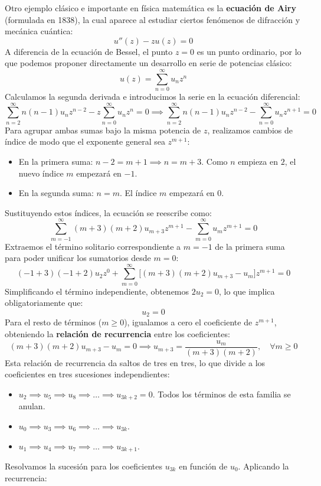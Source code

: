 Otro ejemplo clásico e importante en física matemática es la \textbf{ecuación de Airy} (formulada en 1838), la cual aparece al estudiar ciertos fenómenos de difracción y mecánica cuántica:
\[
    u''(z) - z u(z) = 0
\]
A diferencia de la ecuación de Bessel, el punto $z=0$ es un punto ordinario, por lo que podemos proponer directamente un desarrollo en serie de potencias clásico:
\[
    u(z) = \sum_{n=0}^{\infty} u_n z^n
\]
Calculamos la segunda derivada e introducimos la serie en la ecuación diferencial:
\[
    \sum_{n=2}^{\infty} n(n-1)u_n z^{n-2} - z \sum_{n=0}^{\infty} u_n z^n = 0 \implies \sum_{n=2}^{\infty} n(n-1)u_n z^{n-2} - \sum_{n=0}^{\infty} u_n z^{n+1} = 0
\]
Para agrupar ambas sumas bajo la misma potencia de $z$, realizamos cambios de índice de modo que el exponente general sea $z^{m+1}$:
\begin{itemize}
    \item En la primera suma: $n-2 = m+1 \implies n = m+3$. Como $n$ empieza en $2$, el nuevo índice $m$ empezará en $-1$.
    \item En la segunda suma: $n = m$. El índice $m$ empezará en $0$.
\end{itemize}
Sustituyendo estos índices, la ecuación se reescribe como:
\[
    \sum_{m=-1}^{\infty} (m+3)(m+2)u_{m+3} z^{m+1} - \sum_{m=0}^{\infty} u_m z^{m+1} = 0
\]
Extraemos el término solitario correspondiente a $m=-1$ de la primera suma para poder unificar los sumatorios desde $m=0$:
\[
    (-1+3)(-1+2)u_2 z^0 + \sum_{m=0}^{\infty} \Big[ (m+3)(m+2)u_{m+3} - u_m \Big] z^{m+1} = 0
\]
Simplificando el término independiente, obtenemos $2 u_2 = 0$, lo que implica obligatoriamente que:
\[
    u_2 = 0
\]
Para el resto de términos ($m \geq 0$), igualamos a cero el coeficiente de $z^{m+1}$, obteniendo la \textbf{relación de recurrencia} entre los coeficientes:
\[
    (m+3)(m+2)u_{m+3} - u_m = 0 \implies u_{m+3} = \frac{u_m}{(m+3)(m+2)}, \quad \forall m \geq 0
\]
Esta relación de recurrencia da saltos de tres en tres, lo que divide a los coeficientes en tres sucesiones independientes:
\begin{itemize}
    \item $u_2 \implies u_5 \implies u_8 \implies \dots \implies u_{3k+2} = 0$. Todos los términos de esta familia se anulan.
    \item $u_0 \implies u_3 \implies u_6 \implies \dots \implies u_{3k}$.
    \item $u_1 \implies u_4 \implies u_7 \implies \dots \implies u_{3k+1}$.
\end{itemize}
Resolvamos la sucesión para los coeficientes $u_{3k}$ en función de $u_0$. Aplicando la recurrencia:
